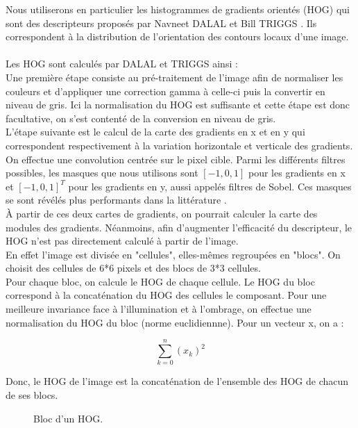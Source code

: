 Nous utiliserons en particulier les histogrammes de gradients orientés (HOG) qui sont des descripteurs proposés par Navneet DALAL et Bill TRIGGS \cite{dalal_histograms_2005}. Ils correspondent à la distribution de l'orientation des contours locaux d'une image. \\
\\
Les HOG sont calculés par DALAL et TRIGGS ainsi : \\

Une première étape consiste au pré-traitement de l'image afin de normaliser les couleurs et d'appliquer une correction gamma à celle-ci puis la convertir en niveau de gris. Ici la normalisation du HOG est suffisante et cette étape est donc facultative, on s'est contenté de la conversion en niveau de gris. \\

L'étape suivante est le calcul de la carte des gradients en x et en y qui correspondent respectivement à la variation horizontale et verticale des gradients. On effectue une convolution centrée sur le pixel cible. Parmi les différents filtres possibles, les masques que nous utilisons sont $[-1, 0, 1]$ pour les gradients en x et $[-1, 0, 1]^{T}$ pour les gradients en y, aussi appelés filtres de Sobel. Ces masques se sont révélés plus performants dans la littérature \cite{dalal_histograms_2005}.\\

À partir de ces deux cartes de gradients, on pourrait calculer la carte des modules des gradients. Néanmoins, afin d'augmenter l'efficacité du descripteur, le HOG n'est pas directement calculé à partir de l'image.\\

En effet l'image est divisée en "cellules", elles-mêmes regroupées en "blocs". On choisit des cellules de 6*6 pixels et des blocs de 3*3 cellules.\\

Pour chaque bloc, on calcule le HOG de chaque cellule. Le HOG du bloc correspond à la concaténation du HOG des cellules le composant. Pour une meilleure invariance face à l'illumination et à l'ombrage, on effectue une normalisation du HOG du bloc (norme euclidiennne). Pour un vecteur x, on a :

\[ \sum_{k=0}^{n} (x_{k})^{2} \]

Donc, le HOG de l'image est la concaténation de l'ensemble des HOG de chacun de ses blocs.

\begin{figure}[!htbp]
\center
\caption{Bloc d'un HOG.}
\label{fig:cuttlefish_bloccells}
\end{figure}
\FloatBarrier

